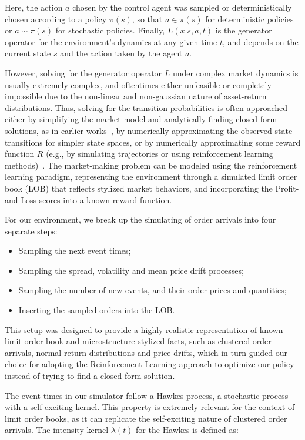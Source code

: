 \documentclass[11pt]{article}
\begin{document}
    Here, the action $a$ chosen by the control agent was sampled or deterministically chosen according to a policy $\pi(s)$,
    so that $a \in \pi(s)$ for deterministic policies or $a \sim \pi(s)$ for stochastic policies.
    Finally, \( L(x|s, a, t) \) is the generator operator for the environment's dynamics at any given time \( t \),
    and depends on the current state $s$ and the action taken by the agent $a$.

    However, solving for the generator operator $L$ under complex market dynamics is usually extremely complex,
    and oftentimes either unfeasible or completely impossible due to the non-linear and non-gaussian nature of asset-return distributions.
    Thus, solving for the transition probabilities is often approached either by simplifying the market model and
    analytically finding closed-form solutions, as in earlier works~\citep{Avellaneda2008, Gueant2017},
    by numerically approximating the observed state transitions for simpler state spaces,
    or by numerically approximating some reward function $R$
    (e.g., by simulating trajectories or using reinforcement learning methods)~\citep{Gueant2022, Gasperov2022, Guo2023}.
    The market-making problem can be modeled using the reinforcement learning paradigm,
    representing the environment through a simulated limit order book (LOB) that reflects stylized market behaviors,
    and incorporating the Profit-and-Loss scores into a known reward function.

    For our environment, we break up the simulating of order arrivals into four separate steps:
    \begin{itemize}
        \item Sampling the next event times;
        \item Sampling the spread, volatility and mean price drift processes;
        \item Sampling the number of new events, and their order prices and quantities;
        \item Inserting the sampled orders into the LOB.
    \end{itemize}
    This setup was designed to provide a highly realistic representation of known limit-order book and
    microstructure stylized facts, such as clustered order arrivals, normal return distributions and price drifts,
    which in turn guided our choice for adopting the Reinforcement Learning approach to optimize our policy instead of trying
    to find a closed-form solution.

    The event times in our simulator follow a Hawkes process,
    a stochastic process with a self-exciting kernel.
    This property is extremely relevant for the context of limit order books,
    as it can replicate the self-exciting nature of clustered order arrivals.
    The intensity kernel \( \lambda(t) \) for the Hawkes is defined as:
\end{document}
